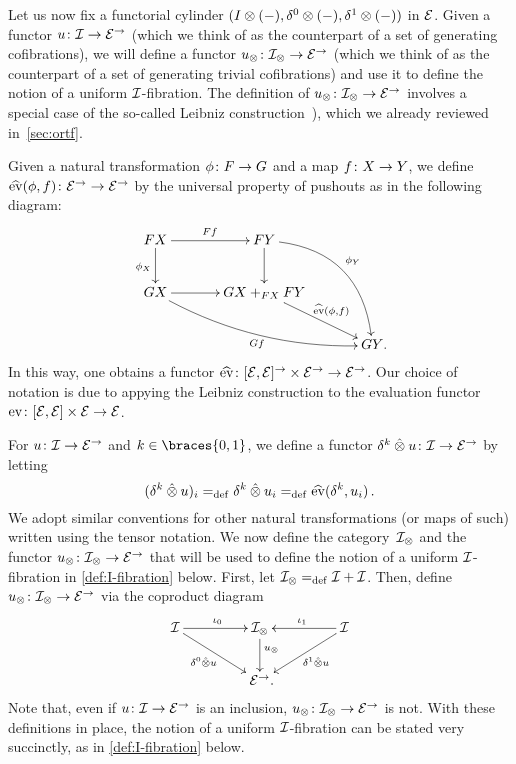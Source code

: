 \documentclass[reqno,10pt,a4paper,oneside,draft]{amsart}
\begin{document}
Let us now fix a functorial cylinder $(\interval \otimes (-), \lcyl \otimes (-), \rcyl \otimes (-))$ in $\calE$.
Given a functor $u \co \cal{I} \to \catE^\to$ (which we think of as the counterpart of a set of generating cofibrations), we will define a functor $u_\otimes \co \cal{I}_\otimes \to \catE^\to$ (which we think of as the counterpart of a set of generating trivial cofibrations) and use it to define the notion of a uniform $\cal{I}$-fibration.
The definition of $u_\otimes \co \cal{I}_\otimes \to \catE^\to$ involves a special case of the so-called Leibniz construction~\cite{riehl-verity:reedy}), which we already reviewed 
in~\cref{sec:ortf}.

Given a natural transformation $\phi \co F \to G$ and a map $f \co X \to Y$, we define $\hateval(\phi, f) \co \catE^\to \to \catE^\to$ by the universal property of pushouts as in the following diagram:
\begin{equation} \label{definition-of-hateval}
\begin{aligned}
\xymatrix@C=1.2cm{
  FX
  \ar[r]^{Ff}
  \ar[d]_{\phi_X}
&
  FY
  \ar@/^2pc/[ddr]^{\phi_Y}
  \ar[d]
&\\
  GX
  \ar@/_1pc/[drr]_{Gf}
  \ar[r]
&
  GX +_{FX} FY
  \ar[dr]^-{\hateval(\phi, f)}
&\\&&
  GY
\rlap{.}}
\end{aligned}
\end{equation}
In this way, one obtains a functor $\hateval \co [\catE, \catE]^\to \times \catE^\to \to \catE^\to$.
Our choice of notation is due to appying the Leibniz construction to the evaluation functor $\eval \co [\catE,\catE] \times \calE \to \catE$.

For $u \co \cal{I} \to \catE^\to$ and $k \in \braces{0, 1}$, we define a functor $\kcyl \hatotimes u \co \cal{I} \to \catE^\to$ by letting
\[
  (\kcyl \hatotimes u)_i \defeq \kcyl \hatotimes u_i  \defeq \hateval(\kcyl, u_i) \, .
\]
We adopt similar conventions for other natural transformations (or maps of such) written using the tensor notation.
We now define the category~$\cal{I}_\otimes$ and the functor $u_\otimes \co \cal{I}_\otimes \to \catE^\to$ that will be used to define the notion of a uniform $\cal{I}$-fibration in \cref{def:I-fibration} below.
First, let $\cal{I}_\otimes \defeq \cal{I} + \cal{I}$.
Then, define $u_\otimes \co \cal{I}_\otimes \to \catE^\to$ via the coproduct diagram
\begin{equation}
\label{equ:u-tensor}
\begin{gathered}
\xymatrix@C+2em{
  \cal{I}
  \ar[r]^{\iota_0}
  \ar[dr]_-{\lcyl \hatotimes u}
&
  \cal{I}_\otimes
  \ar[d]^(.4){u_\otimes}
&
  \cal{I}
  \ar[dl]^-{\rcyl \hatotimes u}
  \ar[l]_{\iota_1}
\\&
  \catE^\to
\rlap{.}}
\end{gathered}
\end{equation}
Note that, even if $u \co \cal{I} \to \catE^\to$ is an inclusion, $u_\otimes \co \cal{I}_\otimes \to \catE^\to$ is not.
With these definitions in place, the notion of a uniform $\cal{I}$-fibration can be stated very succinctly, as in \cref{def:I-fibration} below.
\end{document}
